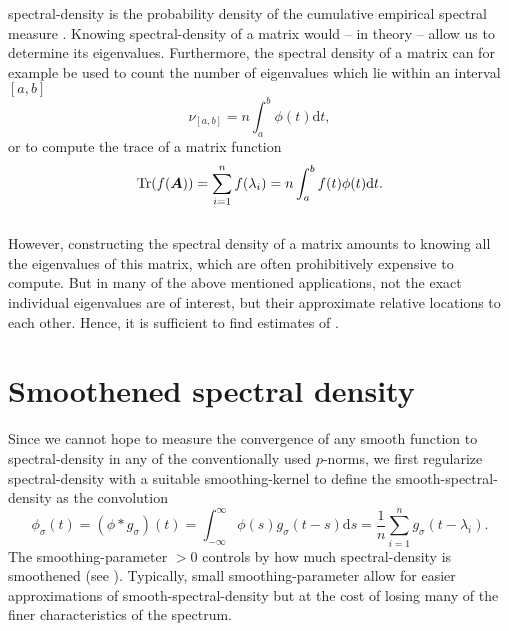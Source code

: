 \gls{spectral-density} is the probability density \cite{klenke2013probability}
of the cumulative empirical spectral measure \cite{chen2021slq}. Knowing \gls{spectral-density}
of a matrix would -- in theory -- allow us to determine its eigenvalues.
Furthermore, the spectral density of a matrix can for example be used to count
the number of eigenvalues which lie within an interval $[a, b]$
\begin{equation}
    \nu_{[a, b]} = n \int_{a}^{b} \phi(t) \mathrm{d}t,
    \label{equ:1-introduction-eigenvalue-counting}
\end{equation}
or to compute the trace of a matrix function \cite{lin2017randomized}
\begin{equation}
    \operatorname{Tr}(f(\boldsymbol{A})) = \sum_{i=1}^n f(\lambda_i) = n \int_{a}^{b} f(t) \phi(t) \mathrm{d}t.
    \label{equ:1-introduction-matrix-trace}
\end{equation}\\

However, constructing the spectral density of a matrix amounts to knowing all
the eigenvalues of this matrix, which are often prohibitively expensive to
compute. But in many of the above mentioned applications, not the exact individual
eigenvalues are of interest, but their approximate relative locations to each
other. Hence, it is sufficient to find estimates of .


\section{Smoothened spectral density}
\label{sec:1-introduction-properties}

Since we cannot hope to measure the convergence of any smooth function to
\gls{spectral-density} in any of the conventionally used $p$-norms,
we first regularize \gls{spectral-density} with a suitable \gls{smoothing-kernel}
to define the \gls{smooth-spectral-density} as the convolution
\begin{equation}
    \phi_{\sigma}(t) = (\phi \ast g_{\sigma})(t) = \int_{-\infty}^{\infty} \phi(s) g_{\sigma}(t - s) \mathrm{d}s = \frac{1}{n} \sum_{i=1}^{n} g_{\sigma}(t - \lambda_i).
    \label{equ:1-introduction-def-smooth-spectral-density}
\end{equation}
The \gls{smoothing-parameter} $>0$ controls by how much \gls{spectral-density} is
smoothened (see ). Typically,
small \gls{smoothing-parameter} allow for easier approximations of \gls{smooth-spectral-density}
but at the cost of losing many of the finer characteristics of the spectrum.\\

